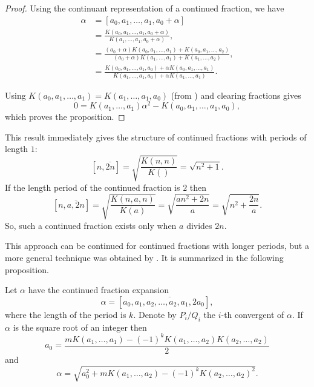 \begin{proof}
Using the continuant representation of a continued fraction, we have 
\[
\begin{aligned}
  \alpha & = [a_0, a_1, \ldots, a_1, a_0 + \alpha] \\
    & = \frac{K(a_0, a_1, \ldots, a_1, a_0 + \alpha)}{K(a_1, \ldots,
a_1, a_0 + \alpha)}, \\
  & = \frac{(a_0 + \alpha) K(a_0, a_1, \ldots, a_1)+K(a_0, a_1,
\ldots, a_2)}{(a_0+\alpha) K(a_1, \ldots,a_1) + K(a_1, \ldots, a_2)}, \\
  & = \frac{K(a_0, a_1, \ldots, a_1, a_0) + \alpha K(a_0, a_1, \ldots,
a_1)}{K(a_1, \ldots, a_1, a_0) + \alpha K(a_1, \ldots, a_1)}.
\end{aligned}
\]

Using $K(a_0, a_1, \ldots, a_1) = K(a_1, \ldots, a_1, a_0)$ (from
) and clearing fractions gives
\[
0 =  K(a_1, \ldots, a_1) \alpha^2 - K(a_0, a_1, \ldots, a_1, a_0),
\]
which proves the proposition.
\end{proof}

This result immediately gives the structure of continued fractions
with periods of length $1$:
\[
[n, \overline{2n}] = \sqrt{\frac{K(n,n)}{K()}} = \sqrt{n^2+1}.
\]
If the length period of the continued fraction is $2$ then 
\[
[n, \overline{a, 2n}] = \sqrt{\frac{K(n,a,n)}{K(a)}} =
\sqrt{\frac{an^2+2n}{a}}
= \sqrt{n^2+\frac{2n}{a}}.
\]
So, such a continued fraction exists only when $a$ divides $2n$.

This approach can be continued for continued fractions with longer
periods, but a more general technique was obtained by {\MuirT}
\cite{Muir1874-xp}.  It is summarized in the following proposition.

\begin{proposition}[Muir] \label{CF:Muir:Prop}
Let $\alpha$ have the continued fraction expansion
\[
\alpha = [a_0, \overline{a_1, a_2, \ldots, a_2, a_1, 2a_0}],
\]
where the length of the period is $k$.  Denote by $P_i/Q_i$ the $i$-th
convergent of $\alpha$.  If $\alpha$ is the square root of an integer
then
\[
a_0 = \frac{m K(a_1, \ldots, a_1) 
            - (-1)^k K(a_1, \ldots, a_2) K(a_2,\ldots, a_2)}{2}
\]
and
\[
\alpha = \sqrt{a_0^2 + m K(a_1, \ldots, a_2) - (-1)^k K(a_2, \ldots, a_2)^2}.
\]
\end{proposition}


